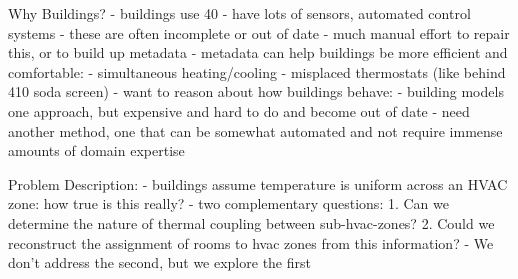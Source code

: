 Why Buildings?
- buildings use 40%
    - have lots of sensors, automated control systems
    - these are often incomplete or out of date
    - much manual effort to repair this, or to build up metadata
    - metadata can help buildings be more efficient and comfortable:
        - simultaneous heating/cooling
        - misplaced thermostats (like behind 410 soda screen)
    - want to reason about how buildings behave:
      - building models one approach, but expensive and hard to do and become out of date
      - need another method, one that can be somewhat automated and not require
        immense amounts of domain expertise

Problem Description:
- buildings assume temperature is uniform across an HVAC zone: how true is this really?
    - two complementary questions:
      1. Can we determine the nature of thermal coupling between sub-hvac-zones?
      2. Could we reconstruct the assignment of rooms to hvac zones from this information?
    - We don't address the second, but we explore the first

\fi
